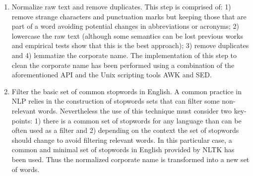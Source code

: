 \documentclass{llncs}
\begin{document}
\begin{enumerate}
 \item Normalize raw text and remove duplicates. This step is comprised of: 1) remove strange characters and punctuation marks but keeping 
 those that are part of a word avoiding potential changes in  abbreviations or acronyms; 2) lowercase the raw text (although some semantics can 
 be lost previous works and empirical tests show that this is the best approach); 3) remove duplicates and 4) lemmatize the corporate name. 
 The implementation of this step to clean the corporate name has been performed using a combination of the aforementioned API and 
 the Unix scripting tools AWK and SED. 

 


   

\item Filter the basic set of common stopwords in English. A common practice in NLP relies in the construction 
of stopwords sets that can filter some non-relevant words. Nevertheless the use of this technique must 
consider two key-points: 1) there is a common set of stopwords for any language than can be often used as a filter and 
2) depending on the context the set of stopwords should change to avoid filtering relevant words. In this particular 
case, a common and minimal set of stopwords in English provided by NLTK has been used. Thus the normalized corporate name is 
transformed into a new set of words. 


\end{enumerate}
\end{document}

